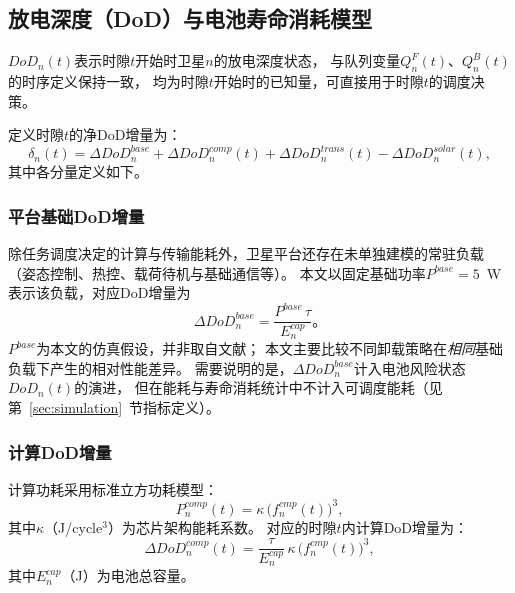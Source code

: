 \documentclass[a4paper,11pt]{article}
\begin{document}
\subsection{放电深度（DoD）与电池寿命消耗模型}

$DoD_n(t)$表示时隙$t$开始时卫星$n$的放电深度状态，
与队列变量$Q^F_n(t)$、$Q^B_n(t)$的时序定义保持一致，
均为时隙$t$开始时的已知量，可直接用于时隙$t$的调度决策。

定义时隙$t$的净DoD增量为：
\begin{equation}
    \delta_n(t) = \Delta DoD^{base}_n
    + \Delta DoD^{comp}_n(t)
    + \Delta DoD^{trans}_n(t)
    - \Delta DoD^{solar}_n(t),
    \label{eq:delta_dod}
\end{equation}
其中各分量定义如下。

\subsubsection{平台基础DoD增量}

除任务调度决定的计算与传输能耗外，卫星平台还存在未单独建模的常驻负载
（姿态控制、热控、载荷待机与基础通信等）。
本文以固定基础功率$P^{base}=5$~W表示该负载，对应DoD增量为
\begin{equation}
    \Delta DoD^{base}_n = \frac{P^{base}\,\tau}{E^{cap}_n}。
    \label{eq:dod_base}
\end{equation}
$P^{base}$为本文的仿真假设，并非取自文献\cite{li2024battery}；
本文主要比较不同卸载策略在\emph{相同}基础负载下产生的相对性能差异。
需要说明的是，$\Delta DoD^{base}_n$计入电池风险状态$DoD_n(t)$的演进，
但在能耗与寿命消耗统计中不计入可调度能耗（见第~\ref{sec:simulation}~节指标定义）。

\subsubsection{计算DoD增量}

计算功耗采用标准立方功耗模型\cite{zhang2024mhspo}：
\begin{equation}
    P^{comp}_n(t) = \kappa\,\big(f^{cmp}_n(t)\big)^3,
    \label{eq:comp_power}
\end{equation}
其中$\kappa$（J/cycle$^3$）为芯片架构能耗系数。
对应的时隙$t$内计算DoD增量为：
\begin{equation}
    \Delta DoD^{comp}_n(t) =
    \frac{\tau}{E^{cap}_n}\,\kappa\,\big(f^{cmp}_n(t)\big)^3,
    \label{eq:dod_comp}
\end{equation}
其中$E^{cap}_n$（J）为电池总容量。
\end{document}
